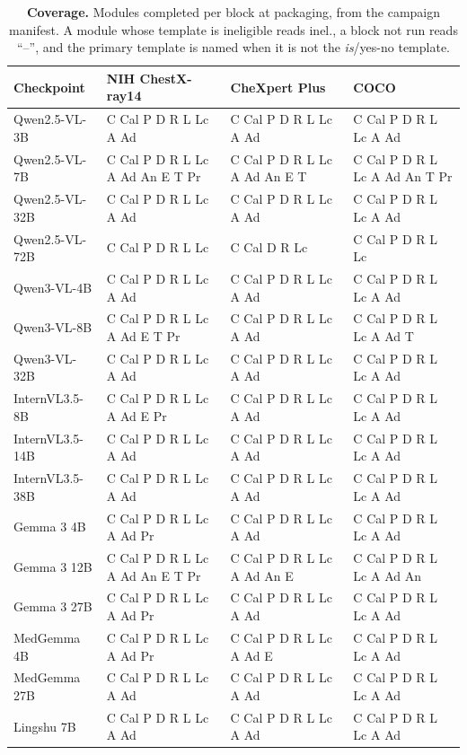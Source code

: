 \documentclass{article}
\begin{document}
\begin{table}[htbp]
\centering
\scriptsize
\setlength{\tabcolsep}{4pt}
\caption{\textbf{Coverage.} Modules completed per block at packaging, from the campaign manifest. A module whose template is ineligible reads inel., a block not run reads ``--'', and the primary template is named when it is not the \emph{is}/yes-no template.}
\label{tab:cf-coverage}
\begin{tabular}{llll}
\toprule
Checkpoint & NIH ChestX-ray14 & CheXpert Plus & COCO\\
\midrule
Qwen2.5-VL-3B & C Cal P D R L Lc A Ad & C Cal P D R L Lc A Ad & C Cal P D R L Lc A Ad \\
Qwen2.5-VL-7B & C Cal P D R L Lc A Ad An E T Pr & C Cal P D R L Lc A Ad An E T & C Cal P D R L Lc A Ad An T Pr \\
Qwen2.5-VL-32B & C Cal P D R L Lc A Ad & C Cal P D R L Lc A Ad & C Cal P D R L Lc A Ad \\
Qwen2.5-VL-72B & C Cal P D R L Lc & C Cal D R Lc & C Cal P D R L Lc \\
Qwen3-VL-4B & C Cal P D R L Lc A Ad & C Cal P D R L Lc A Ad & C Cal P D R L Lc A Ad \\
Qwen3-VL-8B & C Cal P D R L Lc A Ad E T Pr & C Cal P D R L Lc A Ad & C Cal P D R L Lc A Ad T \\
Qwen3-VL-32B & C Cal P D R L Lc A Ad & C Cal P D R L Lc A Ad & C Cal P D R L Lc A Ad \\
InternVL3.5-8B & C Cal P D R L Lc A Ad E Pr & C Cal P D R L Lc A Ad & C Cal P D R L Lc A Ad \\
InternVL3.5-14B & C Cal P D R L Lc A Ad & C Cal P D R L Lc A Ad & C Cal P D R L Lc A Ad \\
InternVL3.5-38B & C Cal P D R L Lc A Ad & C Cal P D R L Lc A Ad & C Cal P D R L Lc A Ad \\
Gemma 3 4B & C Cal P D R L Lc A Ad Pr & C Cal P D R L Lc A Ad & C Cal P D R L Lc A Ad \\
Gemma 3 12B & C Cal P D R L Lc A Ad An E T Pr & C Cal P D R L Lc A Ad An E & C Cal P D R L Lc A Ad An \\
Gemma 3 27B & C Cal P D R L Lc A Ad Pr & C Cal P D R L Lc A Ad & C Cal P D R L Lc A Ad \\
MedGemma 4B & C Cal P D R L Lc A Ad Pr & C Cal P D R L Lc A Ad E & C Cal P D R L Lc A Ad \\
MedGemma 27B & C Cal P D R L Lc A Ad & C Cal P D R L Lc A Ad & C Cal P D R L Lc A Ad \\
Lingshu 7B & C Cal P D R L Lc A Ad & C Cal P D R L Lc A Ad & C Cal P D R L Lc A Ad \\

\end{tabular}
\end{table}
\end{document}
